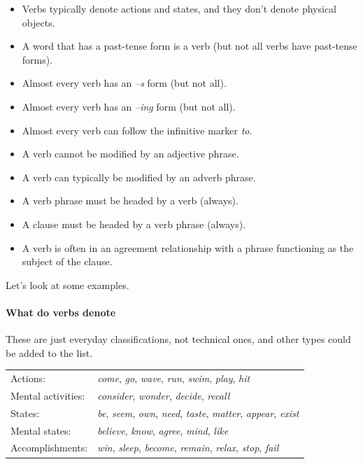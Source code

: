 \begin{itemize}[noitemsep]
    \item {}Verbs typically denote actions and states, and they don't denote physical objects.
    \item {}A word that has a past-tense form is a verb (but not all verbs have past-tense forms).
    \item Almost every verb has an \textit{--s} form (but not all).
    \item Almost every verb has an \textit{--ing} form (but not all).
    \item Almost every verb can follow the infinitive marker \textit{to}.
    \item A verb cannot be modified by an adjective phrase.
    \item {}A verb can typically be modified by an adverb phrase.
    \item A verb phrase must be headed by a verb (always).
    \item {}A clause must be headed by a verb phrase (always).
    \item {}A verb is often in an agreement relationship with a phrase functioning as the subject of the clause.
\end{itemize}

Let's look at some examples.

\paragraph*{What do verbs denote}
These are just everyday classifications, not technical ones, and other types could be added to the list.\\

\begin{tabular}{@{} l l}
    Actions: & \textit{come}, \textit{go}, \textit{wave}, \textit{run}, \textit{swim}, \textit{play}, \textit{hit} \\
    Mental activities: & \textit{consider}, \textit{wonder}, \textit{decide}, \textit{recall} \\
    States: & \textit{be}, \textit{seem}, \textit{own}, \textit{need}, \textit{taste}, \textit{matter}, \textit{appear}, \textit{exist} \\
    Mental states: & \textit{believe}, \textit{know}, \textit{agree}, \textit{mind}, \textit{like} \\
    Accomplishments: & \textit{win}, \textit{sleep}, \textit{become}, \textit{remain}, \textit{relax}, \textit{stop}, \textit{fail}
\end{tabular}\\

